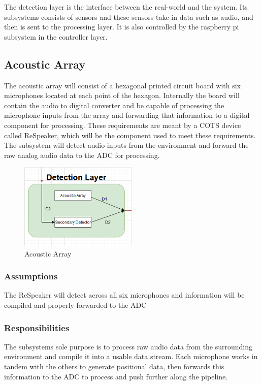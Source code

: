 The detection layer is the interface between the real-world and the system.  Its subsystems consists of sensors and these sensors take in data such as audio, and then is sent to the processing layer.  It is also controlled by the raspberry pi subsystem in the controller layer.

\subsection{Acoustic Array}
The acoustic array will consist of a hexagonal printed circuit board with six microphones located at each point of the hexagon. Internally the board will contain the audio to digital converter and be capable of processing the microphone inputs from the array and forwarding that information to a digital component for processing. These requirements are meant by a COTS device called ReSpeaker, which will be the component used to meet these requirements. The subsystem will detect audio inputs from the environment and forward the raw analog audio data to the ADC for processing.

\begin{figure}[h!]
	\centering
 	\includegraphics[width=0.50\textwidth]{images/detection}
 \caption{Acoustic Array}
\end{figure}

\subsubsection{Assumptions}
The ReSpeaker will detect across all six microphones and information will be compiled and properly forwarded to the ADC

\subsubsection{Responsibilities}
The subsystems sole purpose is to process raw audio data from the surrounding environment and compile it into a usable data stream. Each microphone works in tandem with the others to generate positional data, then forwards this information to the ADC to process and push further along the pipeline.


